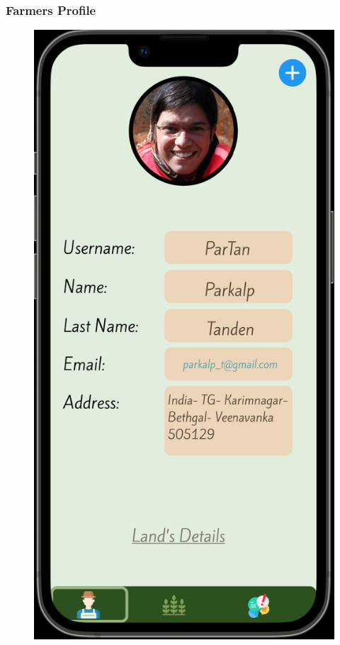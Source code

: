 \subsubsection{Farmers Profile}
    \begin{figure}[ht]
        \centering
        \includegraphics[width = 0.5\linewidth]{figures/profile.png}
        \label{fig:profile}
    \end{figure}
\clearpage

